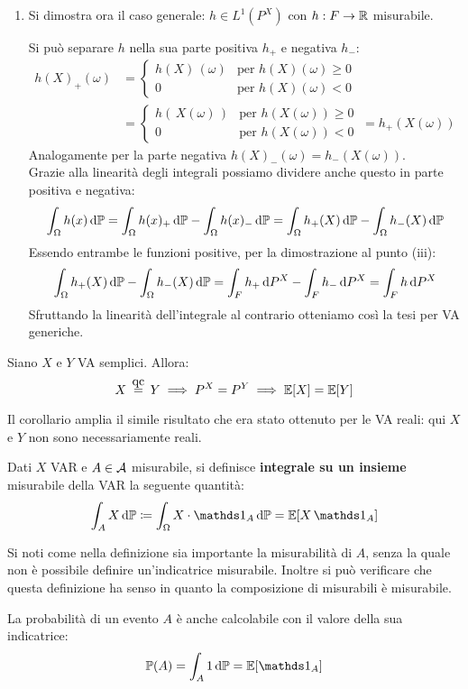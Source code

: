 \begin{dimo}
\begin{enumerate}[label=(\roman*)]
    \item Si dimostra ora il caso generale:
    $h\in L^1 \left(P^X\right)$ con $h: F \to \mathbb R$ misurabile.

    Si può separare $h$ nella sua parte positiva $h_{+}$ e negativa $h_{-}$:
    \begin{align*}
      h(X)_+(\omega)
      & =
      \begin{cases}
      h(X) \, (\omega) &\text{per } h(X)(\omega)\geq 0\\
      0     &\text{per } h(X)(\omega) < 0
      \end{cases} \\
      & =
      \begin{cases}
      h( \, X(\omega) \, ) &\text{per } h(X(\omega))\geq 0\\
      0     &\text{per } h(X(\omega)) < 0
      \end{cases}
      \ = h_+(X(\omega))
    \end{align*}
    Analogamente per la parte negativa $h(X)_-(\omega) = h_-(X(\omega))$.\\
    Grazie alla linearità degli integrali possiamo dividere anche questo in parte positiva e negativa:
    $$
      \int_{\Omega}h(x) \,\mathrm d \mathbb P =
      \int_{\Omega}h(x)_{+} \,\mathrm d \mathbb P-\int_{\Omega}h(x)_{-} \,\mathrm d \mathbb P =
      \int_{\Omega}h_{+}(X) \,\mathrm d \mathbb P-\int_{\Omega}h_{-}(X) \,\mathrm d \mathbb P
    $$
    Essendo entrambe le funzioni positive, per la dimostrazione al punto (iii):
    $$
      \int_{\Omega}h_{+}(X) \,\mathrm d \mathbb P-\int_{\Omega}h_{-}(X) \,\mathrm d \mathbb P =
      \int_{F}h_{+} \,\mathrm d P^{X}-\int_{F}h_{-} \,\mathrm d P^{X} =
      \int_{F}h \,\mathrm d P^X
    $$
    Sfruttando la linearità dell'integrale al contrario otteniamo così la tesi per VA generiche. \qedhere
  \end{enumerate}
\end{dimo}

\medskip

\begin{coro}
  Siano $X$ e $Y$ VA semplici. Allora:
  $$X\aceq Y \implies P^X=P^Y \implies \EE[X]=\EE[Y]$$
\end{coro}
Il corollario amplia il simile risultato che era stato ottenuto per le VA reali: qui $X$ e $Y$ non sono necessariamente reali.

\medskip

\begin{defn}
  Dati $X$ VAR e $A \in \mathcal A$ misurabile, si definisce \textbf{integrale su un insieme} misurabile della VAR la seguente quantità:
  $$\int_A X \, \dPP \coloneqq \int_\Omega X\cdot \Ind_A \, \dPP =  \EE[X \, \Ind_A]$$
\end{defn}
Si noti come nella definizione sia importante la misurabilità di $A$, senza la quale non è possibile definire un'indicatrice misurabile.
Inoltre si può verificare che questa definizione ha senso in quanto la composizione di misurabili è misurabile.

\medskip
\begin{nb}
  La probabilità di un evento $A$ è anche calcolabile con il valore della sua indicatrice:
  $$\PP(A)=\int_{A}1 \, \dPP =\EE[\Ind_{A\\}]$$
\end{nb}

\cleardoublepage
